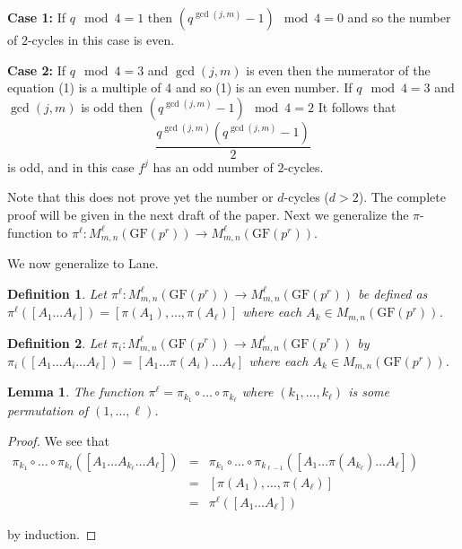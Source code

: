 \documentclass[11pt]{amsart}
\newcommand{\GF}{\mathrm{GF}}
\newtheorem{definition}{{\bf Definition}}
\newtheorem{lemma}[theorem]{{\bf Lemma }}
\begin{document}
{\bf Case 1:} If  $q \mod 4 = 1$ then $(q^{\gcd(j,m)}-1)\mod 4 = 0$ and so the number of $2$-cycles in this case  is even.

{\bf Case 2: } If $q \mod 4 = 3$ and $\gcd(j,m)$ is even then the numerator of the equation (1) is a multiple of 4 and so (1) is an even number.  If $q \mod 4 = 3$ and  $\gcd(j,m)$ is odd then $(q^{\gcd(j,m)} -1) \mod 4 = 2$ It follows that
$$ \dfrac{q^{\gcd(j,m)}(q^{\gcd(j,m)}-1)}{2}$$
is odd, and in this case $f^j$ has an odd number of $2$-cycles.



Note that this does not prove yet the number or $d$-cycles ($d>2$). The complete proof will be given in the next draft of the paper. Next we generalize the $\pi$-function to $\pi^\ell : M^\ell_{m,n}(\GF(p^r)) \to M^\ell_{m,n}(\GF(p^r))$.



We now generalize to Lane.

\begin{definition}
Let $\pi^\ell : M^\ell_{m,n}(\GF(p^r)) \to M^\ell_{m,n}(\GF(p^r))$ be defined as $\pi^\ell([A_1 \dots A_\ell]) = [\pi(A_1), \dots, \pi(A_\ell)]$ where each $A_k \in M_{m,n}(\GF(p^r))$.
\end{definition}

\begin{definition}
Let $\pi_i : M^\ell_{m,n}(\GF(p^r)) \to M^\ell_{m,n}(\GF(p^r))$ by $\pi_i([A_1 \dots A_i \dots A_\ell]) = [A_1 \dots \pi(A_i) \dots A_\ell]$ where each $A_k \in M_{m,n}(\GF(p^r))$.
\end{definition}

\begin{lemma}
The function $\pi^\ell = \pi_{k_1} \circ \dots \circ \pi_{k_\ell}$ where $(k_1, \dots, k_\ell)$ is some permutation of $(1, \dots, \ell)$.
\end{lemma}
\begin{proof}
We see that \\
$
\begin{array}{lcl}
\pi_{k_1} \circ \dots \circ \pi_{k_\ell}([A_1 \dots A_{k_{\ell}} \dots A_\ell]) & = & \pi_{k_1} \circ \dots \circ \pi_{k_{\ell -1}}([A_1 \dots \pi(A_{k_\ell}) \dots A_\ell]) \\
& = & [\pi(A_1), \dots, \pi(A_\ell)] \\
& = & \pi^\ell([A_1 \dots A_\ell])
\end{array}
$

by induction.
\end{proof}
\end{document}
